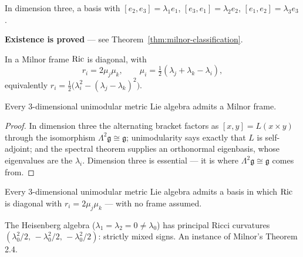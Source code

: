 \begin{definition}
  \label{def:milnor-frame}
  \leanok
  In dimension three, a basis with
  $[e_2,e_3] = \lambda_1 e_1$, $[e_3,e_1] = \lambda_2 e_2$,
  $[e_1,e_2] = \lambda_3 e_3$.

  \textbf{Existence is proved} --- see Theorem~\ref{thm:milnor-classification}.
\end{definition}

\begin{theorem}
  \label{thm:milnor-ricci-diag}
  \leanok
  In a Milnor frame $\operatorname{Ric}$ is diagonal, with
  \[ r_i = 2\mu_j\mu_k, \qquad
     \mu_i = \tfrac12(\lambda_j + \lambda_k - \lambda_i), \]
  equivalently $r_i = \tfrac12\big(\lambda_i^2 - (\lambda_j-\lambda_k)^2\big)$.
\end{theorem}

\begin{theorem}
  \label{thm:milnor-classification}
  \leanok
  Every $3$-dimensional unimodular metric Lie algebra admits a Milnor frame.
\end{theorem}

\begin{proof}
  \leanok
  In dimension three the alternating bracket factors as $[x,y] = L(x \times y)$
  through the isomorphism $\Lambda^2\mathfrak{g} \cong \mathfrak{g}$;
  unimodularity says exactly that $L$ is self-adjoint; and the spectral theorem
  supplies an orthonormal eigenbasis, whose eigenvalues are the $\lambda_i$.
  Dimension three is essential --- it is where $\Lambda^2\mathfrak{g} \cong
  \mathfrak{g}$ comes from.
\end{proof}

\begin{corollary}
  \label{cor:milnor-ricci-diagonalizable}
  \leanok
  Every $3$-dimensional unimodular metric Lie algebra admits a basis in which
  $\operatorname{Ric}$ is diagonal with $r_i = 2\mu_j\mu_k$ --- with no frame assumed.
\end{corollary}

\begin{corollary}
  \label{cor:milnor-heisenberg}
  \leanok
  The Heisenberg algebra ($\lambda_1 = \lambda_2 = 0 \neq \lambda_0$) has
  principal Ricci curvatures
  $(\lambda_0^2/2,\, -\lambda_0^2/2,\, -\lambda_0^2/2)$: strictly mixed signs.
  An instance of Milnor's Theorem 2.4.
\end{corollary}

